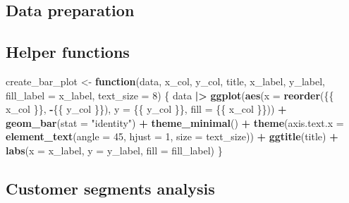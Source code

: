 \documentclass[
]{article}
\newenvironment{Shaded}{\begin{snugshade}}{\end{snugshade}}
\newcommand{\AttributeTok}[1]{\textcolor[rgb]{0.13,0.29,0.53}{#1}}
\newcommand{\ControlFlowTok}[1]{\textcolor[rgb]{0.13,0.29,0.53}{\textbf{#1}}}
\newcommand{\DecValTok}[1]{\textcolor[rgb]{0.00,0.00,0.81}{#1}}
\newcommand{\FunctionTok}[1]{\textcolor[rgb]{0.13,0.29,0.53}{\textbf{#1}}}
\newcommand{\NormalTok}[1]{#1}
\newcommand{\OtherTok}[1]{\textcolor[rgb]{0.56,0.35,0.01}{#1}}
\newcommand{\SpecialCharTok}[1]{\textcolor[rgb]{0.81,0.36,0.00}{\textbf{#1}}}
\newcommand{\StringTok}[1]{\textcolor[rgb]{0.31,0.60,0.02}{#1}}
\begin{document}
\subsection{Data preparation}\label{data-preparation}

\begin{Shaded}
\end{Shaded}

\subsection{Helper functions}\label{helper-functions}

\begin{Shaded}
\begin{Highlighting}[]
\NormalTok{create\_bar\_plot }\OtherTok{\textless{}{-}} \ControlFlowTok{function}\NormalTok{(data, x\_col, y\_col, title, x\_label, y\_label, }\AttributeTok{fill\_label =}\NormalTok{ x\_label, }\AttributeTok{text\_size =} \DecValTok{8}\NormalTok{) \{}
\NormalTok{  data }\SpecialCharTok{|\textgreater{}} 
    \FunctionTok{ggplot}\NormalTok{(}\FunctionTok{aes}\NormalTok{(}\AttributeTok{x =} \FunctionTok{reorder}\NormalTok{(\{\{ x\_col \}\}, }\SpecialCharTok{{-}}\NormalTok{\{\{ y\_col \}\}), }\AttributeTok{y =}\NormalTok{ \{\{ y\_col \}\}, }\AttributeTok{fill =}\NormalTok{ \{\{ x\_col \}\})) }\SpecialCharTok{+}
    \FunctionTok{geom\_bar}\NormalTok{(}\AttributeTok{stat =} \StringTok{"identity"}\NormalTok{) }\SpecialCharTok{+}
    \FunctionTok{theme\_minimal}\NormalTok{() }\SpecialCharTok{+}
    \FunctionTok{theme}\NormalTok{(}\AttributeTok{axis.text.x =} \FunctionTok{element\_text}\NormalTok{(}\AttributeTok{angle =} \DecValTok{45}\NormalTok{, }\AttributeTok{hjust =} \DecValTok{1}\NormalTok{, }\AttributeTok{size =}\NormalTok{ text\_size)) }\SpecialCharTok{+}
    \FunctionTok{ggtitle}\NormalTok{(title) }\SpecialCharTok{+}
    \FunctionTok{labs}\NormalTok{(}\AttributeTok{x =}\NormalTok{ x\_label, }\AttributeTok{y =}\NormalTok{ y\_label, }\AttributeTok{fill =}\NormalTok{ fill\_label)}
\NormalTok{\}}
\end{Highlighting}
\end{Shaded}

\subsection{Customer segments
analysis}\label{customer-segments-analysis}
\end{document}

